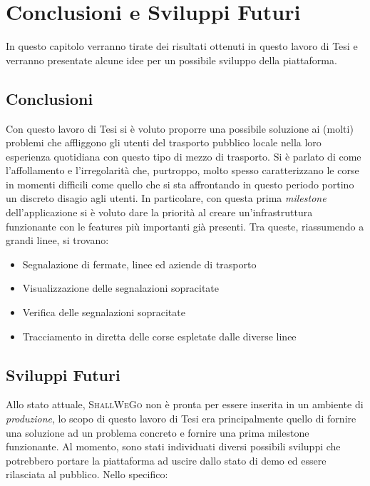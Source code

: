 \chapter{Conclusioni e Sviluppi Futuri} %
%


\begin{citazione}
	In questo capitolo verranno tirate dei risultati ottenuti in questo lavoro di Tesi e verranno presentate alcune idee per un possibile sviluppo della piattaforma.
\end{citazione}

\newpage

\section{Conclusioni}
	Con questo lavoro di Tesi si è voluto proporre una possibile soluzione ai (molti) problemi che affliggono gli utenti del trasporto pubblico locale nella loro esperienza quotidiana con questo tipo di mezzo di trasporto. Si è parlato di come l'affollamento e l'irregolarità che, purtroppo, molto spesso caratterizzano le corse in momenti difficili come quello che si sta affrontando in questo periodo portino un discreto disagio agli utenti. In particolare, con questa prima \textit{milestone} dell'applicazione si è voluto dare la priorità al creare un'infrastruttura funzionante con le features più importanti già presenti. Tra queste, riassumendo a grandi linee, si trovano: 
	\begin{itemize}
		\item Segnalazione di fermate, linee ed aziende di trasporto
		\item Visualizzazione delle segnalazioni sopracitate
		\item Verifica delle segnalazioni sopracitate
		\item Tracciamento in diretta delle corse espletate dalle diverse linee
	\end{itemize}

	\section{Sviluppi Futuri}
		Allo stato attuale, \textsc{ShallWeGo} non è pronta per essere inserita in un ambiente di \textit{produzione}, lo scopo di questo lavoro di Tesi era principalmente quello di fornire una soluzione ad un problema concreto e fornire una prima milestone funzionante. Al momento, sono stati individuati diversi possibili sviluppi che potrebbero portare la piattaforma ad uscire dallo stato di demo ed essere rilasciata al pubblico. Nello specifico: 

